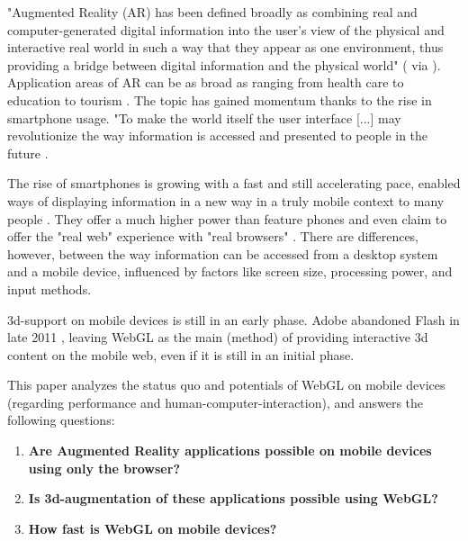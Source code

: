 \documentclass[12pt,journal,compsoc]{IEEEtran}
\begin{document}
"Augmented Reality (AR) has been defined broadly as combining real and computer-generated digital information into the user’s view of the physical and interactive real world in such a way that they appear as one environment, thus providing a bridge between digital information and the physical world" (\cite{Hoellerer2004,Klopfer2007,Vallino1998,Wellner1993} via \cite{Olsson2011b}). Application areas of AR can be as broad as ranging from health care \cite{Lui2011} to education \cite{Mannuss2011} to tourism \cite{Mulloni2011}. The topic has gained momentum thanks to the rise in smartphone usage. "To make the world itself the user interface [...] may revolutionize the way information is accessed and presented to people in the future \cite{Hoellerer2004,Wellner1993}.


The rise of smartphones is growing with a fast and still accelerating pace, enabled ways of displaying information in a new way in a truly mobile context to many people \cite{Gartner2010,Nielsen2011}. They offer a much higher power than feature phones and even claim to offer the "real web" experience with "real browsers" \cite{informationweek2007}. There are differences, however, between the way information can be accessed from a desktop system and a mobile device, influenced by factors like screen size, processing power, and input methods.

3d-support on mobile devices is still in an early phase. Adobe abandoned Flash in late 2011 \cite{Flash2011}, leaving WebGL as the main (method) of providing interactive 3d content on the mobile web, even if it is still in an initial phase.

This paper analyzes the status quo and potentials of WebGL on mobile devices (regarding performance and human-computer-interaction), and answers the following questions:

\begin{enumerate}
	\item \textbf{Are Augmented Reality applications possible on mobile devices using only the browser?}
	\item \textbf{Is 3d-augmentation of these applications possible using WebGL?}
	\item \textbf{How fast is WebGL on mobile devices?}
\end{enumerate}
\end{document}
